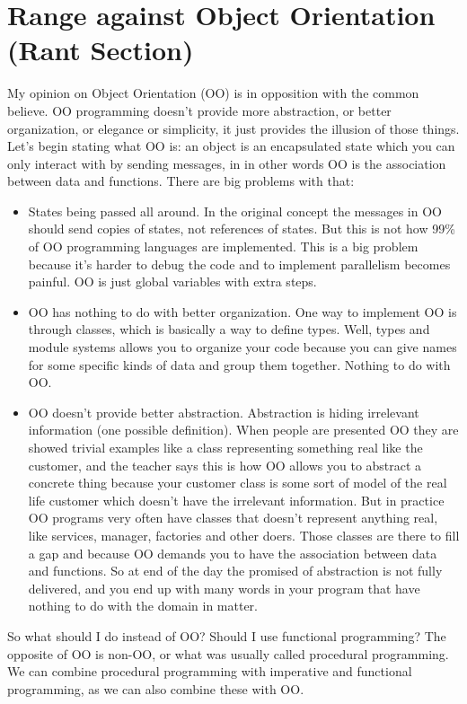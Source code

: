\documentclass[11pt,a4paper,sans]{moderncv}
\begin{document}
\section{Range against Object Orientation (Rant Section)}
My opinion on Object Orientation (OO) is in opposition with the common believe.
OO programming doesn't provide more abstraction, or better organization, or elegance or simplicity, it just provides the illusion of those things.
Let's begin stating what OO is:
an object is an encapsulated state which you can only interact with by sending messages, in in other words OO is the association between data and functions.
There are big problems with that:
\begin{itemize}
  \item States being passed all around. In the original concept the messages in OO should send copies of states, not references of states.
        But this is not how 99\% of OO programming languages are implemented.
        This is a big problem because it's harder to debug the code and to implement parallelism becomes painful.
        OO is just global variables with extra steps.
  \item OO has nothing to do with better organization. One way to implement OO is through classes, which is basically a way to define types.
        Well, types and module systems allows you to organize your code because you can give names for some specific kinds of data and group them together.
        Nothing to do with OO.
  \item OO doesn't provide better abstraction.
        Abstraction is hiding irrelevant information (one possible definition).
        When people are presented OO they are showed trivial examples like a class representing something real like the customer,
        and the teacher says this is how OO allows you to abstract a concrete thing because your customer class is some sort of model
        of the real life customer which doesn't have the irrelevant information.
        But in practice OO programs very often have classes that doesn't represent anything real, like services, manager, factories and other doers.
        Those classes are there to fill a gap and because OO demands you to have the association between data and functions.
        So at end of the day the promised of abstraction is not fully delivered, and you end up with many words in your program that have nothing to do with the domain in matter.
\end{itemize}

So what should I do instead of OO?
Should I use functional programming?
The opposite of OO is non-OO, or what was usually called procedural programming.
We can combine procedural programming with imperative and functional programming, as we can also combine these with OO.
\end{document}

